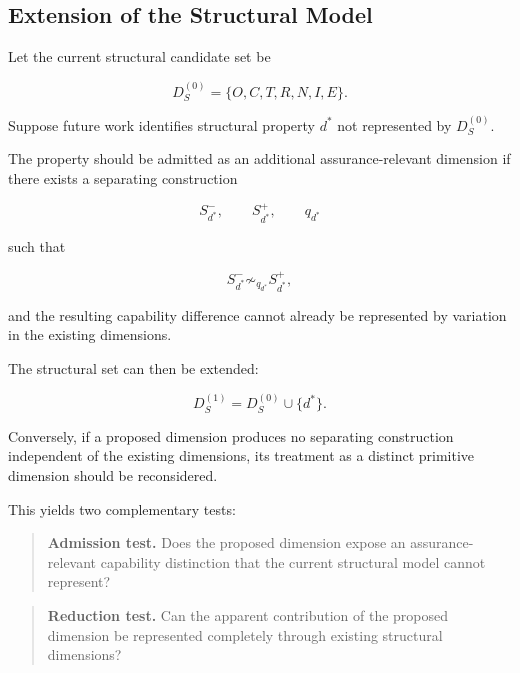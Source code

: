 \subsection{Extension of the Structural Model}
\label{aa.subsec.formal-open-endedness}

Let the current structural candidate set be

\begin{equation}
  D_S^{(0)}
  =
  \{
  O,C,T,R,N,I,E
  \}.
\end{equation}

Suppose future work identifies structural property \(d^\ast\) not represented by \(D_S^{(0)}\).

The property should be admitted as an additional assurance-relevant dimension if there exists a separating construction

\begin{equation}
  S_{d^\ast}^{-},
  \qquad
  S_{d^\ast}^{+},
  \qquad
  q_{d^\ast}
\end{equation}

such that

\begin{equation}
  S_{d^\ast}^{-}
  \not\sim_{q_{d^\ast}}
  S_{d^\ast}^{+},
\end{equation}

and the resulting capability difference cannot already be represented by variation in the existing dimensions.

The structural set can then be extended:

\begin{equation}
  D_S^{(1)}
  =
  D_S^{(0)}
  \cup
  \{d^\ast\}.
\end{equation}

Conversely, if a proposed dimension produces no separating construction independent of the existing dimensions,
its treatment as a distinct primitive dimension should be reconsidered.

This yields two complementary tests:

\begin{quote}
  \textbf{Admission test.}
  Does the proposed dimension expose an assurance-relevant capability distinction
  that the current structural model cannot represent?
\end{quote}

\begin{quote}
  \textbf{Reduction test.}
  Can the apparent contribution of the proposed dimension be represented completely
  through existing structural dimensions?
\end{quote}

